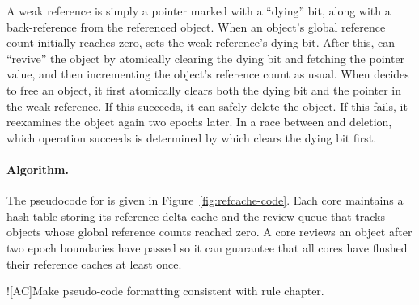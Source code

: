 A weak reference is simply a pointer marked with a ``dying'' bit,
along with a back-reference from the referenced object.  When an
object's global reference count initially reaches zero,  sets
the weak reference's dying bit.  After this,  can
``revive'' the object by atomically clearing the dying bit and
fetching the pointer value, and then incrementing the object's
reference count as usual.  When  decides to free an object,
it first atomically clears both the dying bit and the pointer in the
weak reference.  If this succeeds, it can safely delete the object.
If this fails, it reexamines the object again two epochs later.  In a
race between  and deletion, which operation succeeds is determined
by which clears the dying bit first.

\paragraph{Algorithm.}
The pseudocode for  is given in
Figure~\ref{fig:refcache-code}.  Each core maintains a hash table
storing its reference delta cache and the review queue that tracks
objects whose global reference counts reached zero.  A core reviews an
object after two epoch boundaries have passed so it can guarantee
that all cores have flushed their
reference caches at least once.

\XXX![AC]{Make pseudo-code formatting consistent with rule chapter.}

